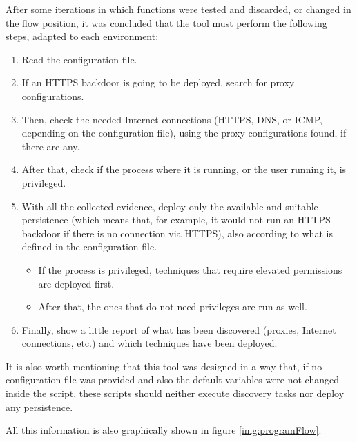 After some iterations in which functions were tested and discarded, or changed in the flow position, it was concluded that the tool must perform the following steps, adapted to each environment:
\begin{enumerate}
\item Read the configuration file.
\item If an HTTPS backdoor is going to be deployed, search for proxy configurations.
\item Then, check the needed Internet connections (HTTPS, DNS, or ICMP, depending on the configuration file), using the proxy configurations found, if there are any.
\item After that, check if the process where it is running, or the user running it, is privileged.
\item With all the collected evidence, deploy only the available and suitable persistence (which means that, for example, it would not run an HTTPS backdoor if there is no connection via HTTPS), also according to what is defined in the configuration file.
\begin{itemize}
\item If the process is privileged, techniques that require elevated permissions are deployed first.
\item After that, the ones that do not need privileges are run as well.
\end{itemize}
\item Finally, show a little report of what has been discovered (proxies, Internet connections, etc.) and which techniques have been deployed.
\end{enumerate} 

It is also worth mentioning that this tool was designed in a way that, if no configuration file was provided and also the default variables were not changed inside the script, these scripts should neither execute discovery tasks nor deploy any persistence.

\pagebreak
All this information is also graphically shown in figure \ref{img:programFlow}.\\

